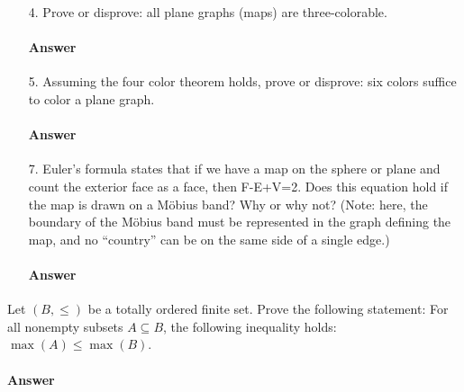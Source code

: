 \documentclass{article}
\begin{document}
\begin{enumerate}
    \item[4.] Prove or disprove: all plane graphs (maps) are three-colorable.

        \paragraph{Answer}
        \todo{}

    \item[5.] Assuming the four color theorem holds, prove or disprove: six colors
        suffice to color a plane graph.

        \paragraph{Answer}
        \todo{}

    \item[7.] Euler's formula states that if we have a map on the sphere or plane
        and count the exterior face as a face, then F-E+V=2.  Does this equation
        hold if the map is drawn on a M\"obius band? Why or why not? (Note:
        here, the boundary of the M\"obius band must be represented in the graph
        defining the map, and no ``country'' can be on the same side of a single
        edge.)

        \paragraph{Answer}

\end{enumerate}




\collab{\todo{}} 

Let $(B,\leq)$ be a totally ordered finite set. Prove the following
statement: For all nonempty subsets $A \subseteq B$, the following inequality
holds: $\max(A) \leq \max(B)$.

\paragraph{Answer}


\collab{\todo{}} 
\end{document}
